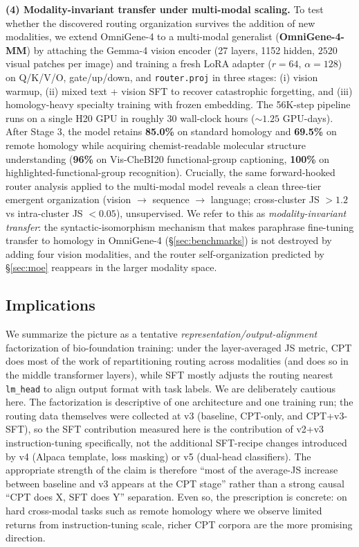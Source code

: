 \documentclass[11pt]{article}
\begin{document}
\textbf{(4) Modality-invariant transfer under multi-modal scaling.} To test whether the discovered routing organization survives the addition of new modalities, we extend OmniGene-4 to a multi-modal generalist (\textbf{OmniGene-4-MM}) by attaching the Gemma-4 vision encoder \citep{gemmateam2025} (27 layers, 1152 hidden, $2520$ visual patches per image) and training a fresh LoRA adapter ($r{=}64$, $\alpha{=}128$) on Q/K/V/O, gate/up/down, and \texttt{router.proj} in three stages: (i) vision warmup, (ii) mixed text + vision SFT to recover catastrophic forgetting, and (iii) homology-heavy specialty training with frozen embedding. The 56K-step pipeline runs on a single H20 GPU in roughly $30$ wall-clock hours ($\sim 1.25$ GPU-days). After Stage 3, the model retains \textbf{85.0\%} on standard homology and \textbf{69.5\%} on remote homology while acquiring chemist-readable molecular structure understanding (\textbf{96\%} on Vis-CheBI20 functional-group captioning, \textbf{100\%} on highlighted-functional-group recognition). Crucially, the same forward-hooked router analysis applied to the multi-modal model reveals a clean three-tier emergent organization (vision $\rightarrow$ sequence $\rightarrow$ language; cross-cluster JS $>1.2$ vs intra-cluster JS $<0.05$), unsupervised. We refer to this as \emph{modality-invariant transfer}: the syntactic-isomorphism mechanism that makes paraphrase fine-tuning transfer to homology in OmniGene-4 (\S\ref{sec:benchmarks}) is not destroyed by adding four vision modalities, and the router self-organization predicted by \S\ref{sec:moe} reappears in the larger modality space.

\subsection*{Implications}

We summarize the picture as a tentative \emph{representation/output-alignment} factorization of bio-foundation training: under the layer-averaged JS metric, CPT does most of the work of repartitioning routing across modalities (and does so in the middle transformer layers), while SFT mostly adjusts the routing nearest \texttt{lm\_head} to align output format with task labels. We are deliberately cautious here. The factorization is descriptive of one architecture and one training run; the routing data themselves were collected at v3 (baseline, CPT-only, and CPT+v3-SFT), so the SFT contribution measured here is the contribution of v2+v3 instruction-tuning specifically, not the additional SFT-recipe changes introduced by v4 (Alpaca template, loss masking) or v5 (dual-head classifiers). The appropriate strength of the claim is therefore ``most of the average-JS increase between baseline and v3 appears at the CPT stage'' rather than a strong causal ``CPT does X, SFT does Y'' separation. Even so, the prescription is concrete: on hard cross-modal tasks such as remote homology where we observe limited returns from instruction-tuning scale, richer CPT corpora are the more promising direction.
\end{document}
